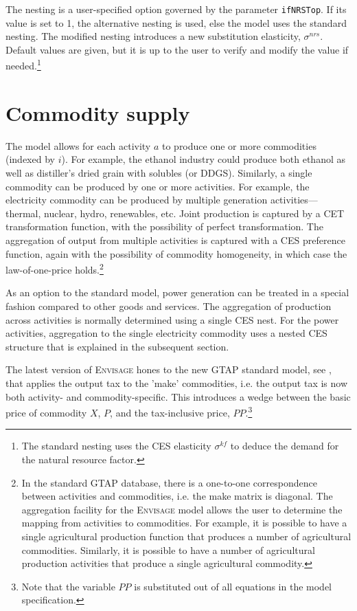 \documentclass[11pt,letterpaper]{report}
\begin{document}
The nesting is a user-specified option governed by the
parameter \texttt{ifNRSTop}. If its value is set to 1, the
alternative nesting is used, else the model uses the
standard nesting. The modified nesting introduces a new
substitution elasticity, $\sigma^{\mathit{nrs}}$. Default
values are given, but it is up to the user to verify and
modify the value if needed.\footnote{The standard nesting
uses the CES elasticity $\sigma^{\mathit{kf}}$ to deduce
the demand for the natural resource factor.}

\section{Commodity supply}
\renewcommand{\theequation}{{S-}\arabic{equation}}
\setcounter{equation}{0}

The model allows for each activity $a$ to produce one or more commodities
(indexed by $i$). For example, the ethanol industry could produce both ethanol
as well as distiller's dried grain with solubles (or DDGS). Similarly, a single
commodity can be produced by one or more activities. For example, the
electricity commodity can be produced by multiple generation
activities---thermal, nuclear, hydro, renewables, etc. Joint production is
captured by a CET transformation function, with the possibility of perfect
transformation. The aggregation of output from multiple activities is captured
with a CES preference function, again with the possibility of commodity
homogeneity, in which case the law-of-one-price holds.\footnote{In the standard
GTAP database, there is a one-to-one correspondence between activities and
commodities, i.e. the make matrix is diagonal. The aggregation facility for the
\textsc{Envisage} model allows the user to determine the mapping from activities
to commodities. For example, it is possible to have a single agricultural
production function that produces a number of agricultural commodities.
Similarly, it is possible to have a number of agricultural production activities
that produce a single agricultural commodity.}

As an option to the standard model, power generation can be treated in a special
fashion compared to other goods and services. The aggregation of production
across activities is normally determined using a single CES nest. For the power
activities, aggregation to the single electricity commodity uses a nested CES
structure that is explained in the subsequent section.

The latest version of \textsc{Envisage} hones to the new GTAP standard model,
see \cite{CorongGEA2017}, that applies the output tax to the 'make' commodities,
i.e. the output tax is now both activity- and commodity-specific. This
introduces a wedge between the basic price of commodity $X$, $P$, and the
tax-inclusive price, $\mathit{PP}$.\footnote{Note that the variable
$\mathit{PP}$ is substituted out of all equations in the model specification.}
\end{document}
